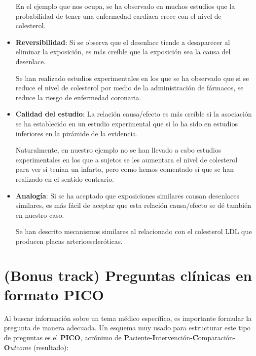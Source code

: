 \documentclass[
]{book}
\theoremstyle{definition}
\theoremstyle{definition}
\theoremstyle{definition}
\theoremstyle{definition}
\theoremstyle{remark}
\begin{document}
\begin{itemize}
  En el ejemplo que nos ocupa, se ha observado en muchos estudios que la probabilidad de tener una enfermedad cardíaca crece con el nivel de colesterol.
\item
  \textbf{Reversibilidad}: Si se observa que el desenlace tiende a desaparecer al eliminar la exposición, es más creíble que la exposición sea la causa del desenlace.

  Se han realizado estudios experimentales en los que se ha observado que si se reduce el nivel de colesterol por medio de la administración de fármacos, se reduce la riesgo de enfermedad coronaria.
\item
  \textbf{Calidad del estudio}: La relación causa/efecto es más creíble si la asociación se ha establecido en un estudio experimental que si lo ha sido en estudios inferiores en la pirámide de la evidencia.

  Naturalmente, en nuestro ejemplo no se han llevado a cabo estudios experimentales en los que a sujetos se les aumentara el nivel de colesterol para ver si tenían un infarto, pero como hemos comentado sí que se han realizado en el sentido contrario.
\item
  \textbf{Analogía}: Si se ha aceptado que exposiciones similares causan desenlaces similares, es más fácil de aceptar que esta relación causa/efecto se dé también en nuestro caso.

  Se han descrito mecanismos similares al relacionado con el colesterol LDL que producen placas arterioescleróticas.
\end{itemize}

\hypertarget{bonus-track-preguntas-cluxednicas-en-formato-pico}{%
\section{(Bonus track) Preguntas clínicas en formato PICO}\label{bonus-track-preguntas-cluxednicas-en-formato-pico}}

Al buscar información sobre un tema médico específico, es importante formular la pregunta de manera adecuada. Un esquema muy usado para estructurar este tipo de preguntas es el \textbf{PICO}, acrónimo de \textbf{P}aciente-\textbf{I}ntervención-\textbf{C}omparación-\textbf{O}\emph{utcome} (resultado):
\end{document}
